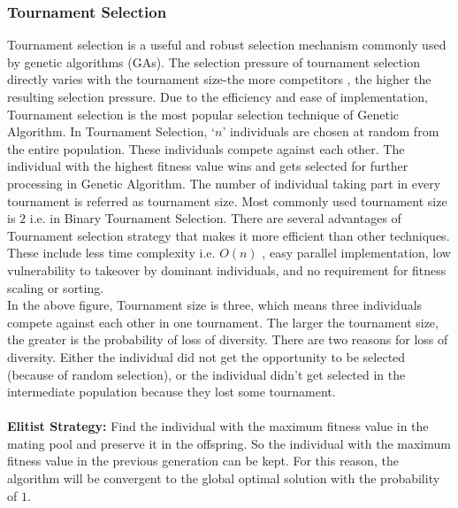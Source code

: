 \documentclass[a4paper, 12pt]{article}
\begin{document}
\subsubsection{Tournament Selection}
Tournament selection is a useful and robust selection mechanism commonly used by genetic algorithms (GAs). The selection pressure of
tournament selection directly varies with the tournament size-the more competitors , the higher the resulting selection pressure. Due to the 
efficiency and ease of implementation, Tournament selection is the most popular selection technique of Genetic Algorithm. In Tournament 
Selection, ‘$n$’ individuals are chosen at random from the entire population. These individuals compete against each other. The individual with 
the highest fitness value wins and gets selected for further processing in Genetic Algorithm. The number of individual taking part in every 
tournament is referred as tournament size. Most commonly used tournament size is $2$ i.e. in Binary Tournament Selection. There are several advantages of Tournament selection strategy that makes it more efficient than other techniques. These include less time complexity i.e. $O\left(n\right)$ , easy 
parallel implementation, low vulnerability to takeover by dominant individuals, and no requirement for fitness scaling or sorting.\\
\noindent
In the above figure, Tournament size is three, which means three individuals compete against each other in one tournament. The larger the 
tournament size, the greater is the probability of loss of diversity. There are two reasons for loss of diversity. Either the individual did 
not get the opportunity to be selected (because of random selection), or the individual didn’t get selected in the intermediate population 
because they lost some tournament.\\
\\\textbf{Elitist Strategy:}
Find the individual with the maximum fitness value in the mating pool and preserve it in the offspring. So the individual with the maximum 
fitness value in the previous generation can be kept. For this reason, the algorithm will be convergent to the global optimal solution with the
probability of $1$.
\end{document}
